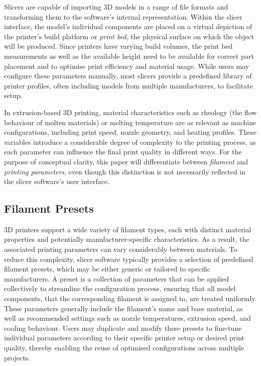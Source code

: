 Slicers are capable of importing 3D models in a range of file formats and transforming them to the software's internal representation. 
Within the slicer interface, the model's individual components are placed on a virtual depiction of the printer's build platform or \textit{print bed}, the physical surface on which the object will be produced. 
Since printers have varying build volumes, the print bed measurements as well as the available height need to be available for correct part placement and to optimise print efficiency and material usage. 
While users may configure these parameters manually, most slicers provide a predefined library of printer profiles, often including models from multiple manufacturers, to facilitate setup.

In extrusion-based 3D printing, material characteristics such as rheology (the flow behaviour of molten materials) or melting temperature are as relevant as machine configurations, including print speed, nozzle geometry, and heating profiles.\cite{subbaraman_shape_2025}
These variables introduce a considerable degree of complexity to the printing process, as each parameter can influence the final print quality in different ways. 
For the purpose of conceptual clarity, this paper will differentiate between \textit{filament} and\textit{ printing parameters}, even though this distinction is not necessarily reflected in the slicer software's user interface. 

\subsection{Filament Presets}

3D printers support a wide variety of filament types, each with distinct material properties and potentially manufacturer-specific characteristics.
As a result, the associated printing parameters can vary considerably between materials.
To reduce this complexity, slicer software typically provides a selection of predefined filament presets, which may be either generic or tailored to specific manufacturers.
A preset is a collection of parameters that can be applied collectively to streamline the configuration process, ensuring that all model components, that the corresponding filament is assigned to, are treated uniformly.
These parameters generally include the filament’s name and base material, as well as recommended settings such as nozzle temperatures, extrusion speed, and cooling behaviour.
Users may duplicate and modify these presets to fine-tune individual parameters according to their specific printer setup or desired print quality, thereby enabling the reuse of optimised configurations across multiple projects.

